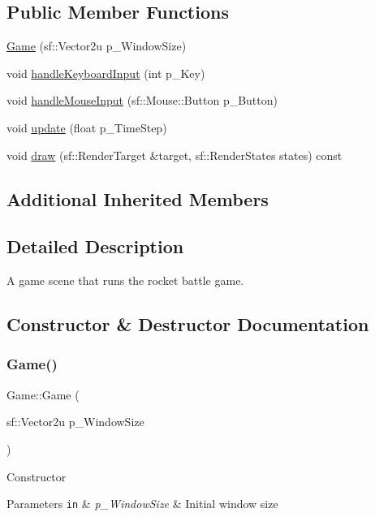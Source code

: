 \subsection*{Public Member Functions}
\begin{DoxyCompactItemize}
\item 
\hyperlink{class_game_acfaa5dfffe755ef1b09948e9074189b5}{Game} (sf\+::\+Vector2u p\+\_\+\+Window\+Size)
\item 
void \hyperlink{class_game_a6ccc7e91593f06a0e722cc419016a237}{handle\+Keyboard\+Input} (int p\+\_\+\+Key)
\item 
void \hyperlink{class_game_a1c0ddbb7a468997249acbdd6cf2dbe34}{handle\+Mouse\+Input} (sf\+::\+Mouse\+::\+Button p\+\_\+\+Button)
\item 
void \hyperlink{class_game_a3fd12339411955db6a5445ba213ef293}{update} (float p\+\_\+\+Time\+Step)
\item 
void \hyperlink{class_game_a143d1a2f8a527db60f1fe47ab3d854a7}{draw} (sf\+::\+Render\+Target \&target, sf\+::\+Render\+States states) const
\end{DoxyCompactItemize}
\subsection*{Additional Inherited Members}


\subsection{Detailed Description}
A game scene that runs the rocket battle game. 

\subsection{Constructor \& Destructor Documentation}
\mbox{\label{class_game_acfaa5dfffe755ef1b09948e9074189b5}} 
\subsubsection{\texorpdfstring{Game()}{Game()}}
{\footnotesize\ttfamily Game\+::\+Game (\begin{DoxyParamCaption}\item[{sf\+::\+Vector2u}]{p\+\_\+\+Window\+Size }\end{DoxyParamCaption})}

Constructor 
\begin{DoxyParams}[1]{Parameters}
\mbox{\tt in}  & {\em p\+\_\+\+Window\+Size} & Initial window size \\
\hline
\end{DoxyParams}


